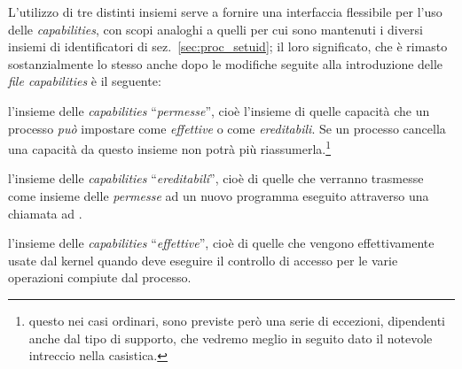 L'utilizzo di tre distinti insiemi serve a fornire una interfaccia flessibile
per l'uso delle \textit{capabilities}, con scopi analoghi a quelli per cui
sono mantenuti i diversi insiemi di identificatori di
sez.~\ref{sec:proc_setuid}; il loro significato, che è rimasto sostanzialmente
lo stesso anche dopo le modifiche seguite alla introduzione delle
\textit{file capabilities} è il seguente:
\begin{basedescript}{\desclabelwidth{2.1cm}\desclabelstyle{\nextlinelabel}}
\item[\textit{permitted}] l'insieme delle \textit{capabilities}
  ``\textsl{permesse}'', cioè l'insieme di quelle capacità che un processo
  \textsl{può} impostare come \textsl{effettive} o come
  \textsl{ereditabili}. Se un processo cancella una capacità da questo insieme
  non potrà più riassumerla.\footnote{questo nei casi ordinari, sono
    previste però una serie di eccezioni, dipendenti anche dal tipo di
    supporto, che vedremo meglio in seguito dato il notevole intreccio nella
    casistica.}
\item[\textit{inheritable}] l'insieme delle \textit{capabilities}
  ``\textsl{ereditabili}'', cioè di quelle che verranno trasmesse come insieme
  delle \textsl{permesse} ad un nuovo programma eseguito attraverso una
  chiamata ad .
\item[\textit{effective}] l'insieme delle \textit{capabilities}
  ``\textsl{effettive}'', cioè di quelle che vengono effettivamente usate dal
  kernel quando deve eseguire il controllo di accesso per le varie operazioni
  compiute dal processo.
\label{sec:capabilities_set}
\end{basedescript}


